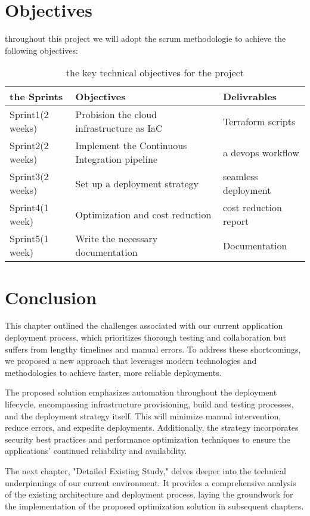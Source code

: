 \section{Objectives}
throughout  this project we will adopt the scrum methodologie to achieve the following objectives:
\begin{longtable}[c]{
    |p{}
    |p{}|
    p{}|
}
    \caption{the key technical objectives for the project}
    \label{tab:myfirstlongtable}\\
    \hline
    
    the Sprints
    & Objectives
    & Delivrables \\
     \hline

    Sprint1(2 weeks)
    & Probision the cloud infrastructure as IaC
    & Terraform scripts \\
    \hline

    Sprint2(2 weeks)
    & Implement the Continuous Integration pipeline
    & a devops workflow \\
    \hline

    Sprint3(2 weeks)
    & Set up a deployment strategy 
    & seamless deployment\\
    \hline

    Sprint4(1 week)
    & Optimization and cost reduction
    & cost reduction report\\
    \hline

    Sprint5(1 week)
    & Write the necessary documentation
    & Documentation\\
    \hline
    
\end{longtable}

\section*{Conclusion}
This chapter outlined the challenges associated with our current application deployment process, which prioritizes thorough testing and collaboration but suffers from lengthy timelines and manual errors. To address these shortcomings, we proposed a new approach that leverages modern technologies and methodologies to achieve faster, more reliable deployments.
\par
The proposed solution emphasizes automation throughout the deployment lifecycle, encompassing infrastructure provisioning, build and testing processes, and the deployment strategy itself. This will minimize manual intervention, reduce errors, and expedite deployments. Additionally, the strategy incorporates security best practices and performance optimization techniques to ensure the applications' continued reliability and availability.
\par
The next chapter, "Detailed Existing Study," delves deeper into the technical underpinnings of our current environment. It provides a comprehensive analysis of the existing architecture and deployment process, laying the groundwork for the implementation of the proposed optimization solution in subsequent chapters.